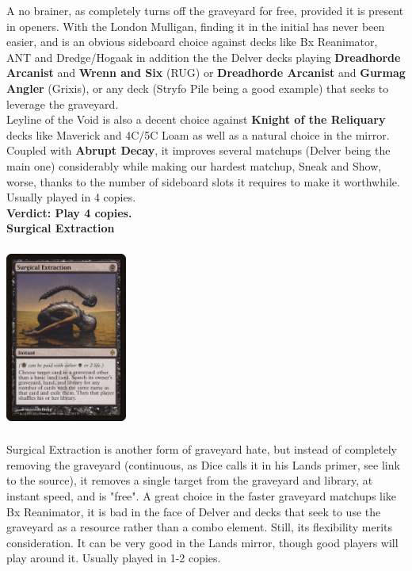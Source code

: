 \documentclass{report}
\begin{document}
A no brainer, as completely turns off the graveyard for free, provided it is present in openers. With the London Mulligan, finding it in the initial has never been easier, and is an obvious sideboard choice against decks like Bx Reanimator, ANT and Dredge/Hogaak in addition the the Delver decks playing \textbf{Dreadhorde Arcanist} and \textbf{Wrenn and Six} (RUG) or \textbf{Dreadhorde Arcanist} and \textbf{Gurmag Angler} (Grixis), or any deck (Stryfo Pile being a good example) that seeks to leverage the graveyard.\\ Leyline of the Void is also a decent choice against \textbf{Knight of the Reliquary} decks like Maverick and 4C/5C Loam as well as a natural choice in the mirror. Coupled with \textbf{Abrupt Decay}, it improves several matchups  (Delver being the main one) considerably while making our hardest matchup, Sneak and Show, worse, thanks to the number of sideboard slots it requires to make it worthwhile. Usually played in 4 copies.\\
\textbf{Verdict: Play 4 copies.\\}
\textbf{Surgical Extraction\\}
\begin{center}
\includegraphics [width = 4cm, height = 6cm] {surgical-extraction}
\end{center}
Surgical Extraction is another form of graveyard hate, but instead of completely removing the graveyard (continuous, as Dice calls it in his Lands primer, see link to the source), it removes a single target from the graveyard and library, at instant speed, and is "free". A great choice in the faster graveyard matchups like Bx Reanimator, it is bad in the face of Delver and decks that seek to use the graveyard as a resource rather than a combo element. Still, its flexibility merits consideration. It can be very good in the Lands mirror, though good players will play around it.
Usually played in 1-2 copies.\\
\end{document}

